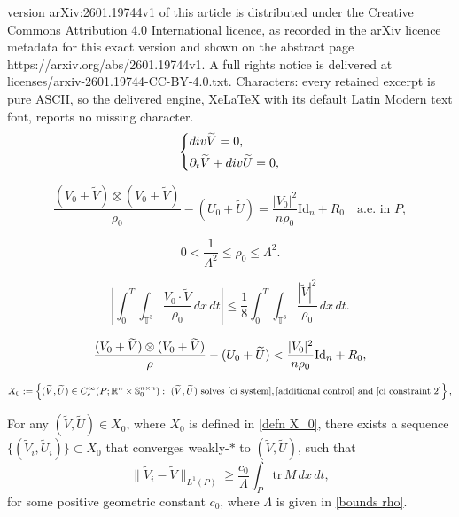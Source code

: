 \documentclass[10pt,a4paper]{amsart}
\newcommand{\Dv}{{\rm div}}
\newcommand{\R}{{\mathbb R}}
\newcommand{\id}{\mathrm{Id}}
\newcommand{\trace}{\mathrm{tr}}
\begin{document}
version arXiv:2601.19744v1 of this article is distributed under the Creative Commons Attribution 4.0 International licence, as recorded in the arXiv licence metadata for this exact version and shown on the abstract page https://arxiv.org/abs/2601.19744v1. A full rights notice is delivered at licenses/arxiv-2601.19744-CC-BY-4.0.txt. Characters: every retained excerpt is pure ASCII, so the delivered engine, XeLaTeX with its default Latin Modern text font, reports no missing character.
\begin{equation}
\label{ci system}
 \left\{
\begin{split}
&\Dv \widetilde{V}=0,\\
&\partial_t\widetilde{V}+\Dv \widetilde{U}=0,
\end{split}\right.
\end{equation} 

\begin{equation}
\label{restriction =}
\frac{(V_0 + \widetilde{V}) \otimes (V_0 + \widetilde{V})}{\rho_0} - (U_0 + \widetilde{U}) = \frac{|V_0|^2}{n\rho_0} \id_n + R_0 \quad \text{a.e. in } P,
\end{equation}

\begin{equation}
 \label{bounds rho}
 0<\frac{1}{\Lambda^2}\leq \rho_0\leq \Lambda^2.
 \end{equation}

\begin{equation}
\label{additional control}
\left|\int_0^T\int_{\mathbb{T}^3}\frac{V_0\cdot\widetilde{V}}{\rho_0}\,dx\,dt\right|\leq \frac{1}{8}\int_0^T\int_{\mathbb{T}^3} \frac{|\widetilde{V}|^2}{\rho_0}\,dx\,dt.
\end{equation}

\begin{equation}
\label{ci constraint 2}
\frac{(V_0 + \widetilde{V}) \otimes (V_0 + \widetilde{V})} { \rho} - (U_0 + \widetilde U) < {|V_0|^2 \over n\rho_0} \id_n + R_0,
\end{equation}

\begin{equation}\label{defn X_0}
X_0 := \left\{ (\widetilde V, \widetilde U) \in C^\infty_c(P; \R^n \times \mathbb{S}^{n\times n}_0): \ (\widetilde V, \widetilde U) \text{ solves } \eqref{ci system},   \eqref{additional control} \text{ and } \eqref{ci constraint 2} \right\},
\end{equation}

\begin{Lemma}[$L^1$-coercivity]
\label{L1-coercivity}
For any $(\widetilde{V}, \widetilde{U}) \in X_0$, where $X_0$ is defined in \eqref{defn X_0}, there exists a sequence $\{(\widetilde{V}_i, \widetilde{U}_i)\} \subset X_0$ that converges weakly-$*$ to $(\widetilde{V}, \widetilde{U})$, such that
$$
\|\widetilde{V}_i - \widetilde{V}\|_{L^1(P)} \geq \frac{c_0}{\Lambda} \int_{P} \trace \, M \, dx \, dt,
$$
for some positive geometric constant $c_0$, where $\Lambda$ is given in \eqref{bounds rho}.
\end{Lemma}
\end{document}
